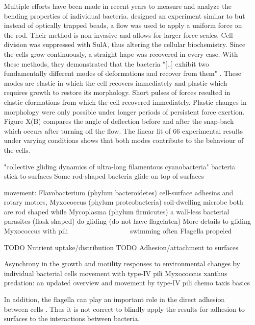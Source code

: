 \documentclass{article}
\newcommand{\todo}[1]{\colorbox{WildStrawberry}{\textcolor{white}{#1}}}
\begin{document}
Multiple efforts have been made in recent years to measure and analyze the bending properties of individual bacteria.
\cite{Amir2014_2} designed an experiment similar to \cite{Wang2010,Wang2010_protocol} but instead of optically trapped beads, a flow was used to apply a uniform force on the rod.
Their method is non-invasive and allows for larger force scales.
Cell-division was suppressed with SulA, thus altering the cellular biochemistry.
Since the cells grow continuously, a straight  hape was recovered in every case.
With these methods, they demonstrated that the bacteria "[..] exhibit two fundamentally different modes of deformations and recover from them" \cite{Amir2014_2}.
These modes are elastic in which the cell recovers immediately and plastic which requires growth to restore its morphology.
Short pulses of forces resulted in elastic  eformations from which the cell recovered immediately.
Plastic changes in morphology were only possible under longer periods of persistent force exertion.
Figure X(B) compares the angle  of deflection before and after the snap-back which occurs after turning off the flow.
The linear fit of 66 experimental results under varying conditions shows that both modes contribute to the behaviour of the cells.

\cite{Moreau2018} "collective gliding dynamics of ultra-long filamentous cyanobacteria"
\cite{BrettFinlay2014} bacteria stick to surfaces
\cite{Shah2022} Some rod-shaped bacteria glide on top of surfaces

movement:
Flavobacterium (phylum bacteroidetes) cell-surface adhesins and rotary motors, Myxococcus (phylum proteobacteria) soil-dwelling microbe both are rod shaped while Mycoplasma (phylum firmicutes) a wall-less bacterial parasites (flask shaped) do gliding (do not have flagelaten) \cite{Shrivastava2015}
More details to gliding Myxococcus with pili \todo{@Toqi find citation}
swimming \cite{Kong2014} often Flagella propeled \cite{Harshey2015}

TODO Nutrient uptake/distribution
TODO Adhesion/attachment to surfaces


Asynchrony in the growth and motility responses to environmental changes by individual bacterial cells \cite{Senkei2007}
movement with type-IV pili \cite{Ellison2021}
Myxococcus xanthus predation: an updated overview and movement by type-IV pili \cite{ContrerasM2024}
chemo taxis basics \cite{Nikita2009}

In addition, the flagella can play an important role in the direct adhesion between cells \cite{Haiko2013}. Thus it is not correct to blindly apply the results for adhesion to surfaces to the interactions between bacteria.
\end{document}
